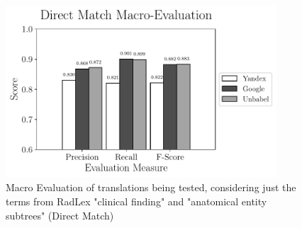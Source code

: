 \begin{figure}[h]
	\centering
	\includegraphics[width=0.9\textwidth]{SupportFiles/plots/direct_match_macro_clinical_anatomical_subtrees_plot.pdf}
	\caption{Macro Evaluation of translations being tested, considering just the terms from RadLex "clinical finding" and "anatomical entity subtrees" (Direct Match)}
	\label{app:macro_eval_subtrees_direct}
\end{figure}


